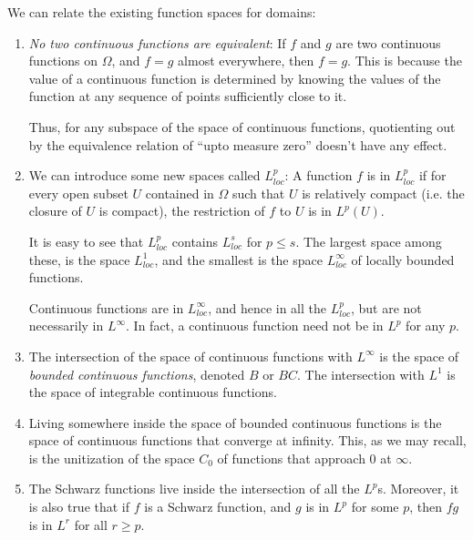 \documentclass[a4paper]{amsart}
\begin{document}
We can relate the existing function spaces for domains:

\begin{enumerate}

\item {\em No two continuous functions are equivalent}: If $f$ and $g$
  are two continuous functions on $\Omega$, and $f = g$ almost
  everywhere, then $f = g$. This is because the value of a continuous
  function is determined by knowing the values of the function at any
  sequence of points sufficiently close to it.

  Thus, for any subspace of the space of continuous functions,
  quotienting out by the equivalence relation of ``upto measure zero''
  doesn't have any effect.

\item We can introduce some new spaces called $L^p_{loc}$: A function
  $f$ is in $L^p_{loc}$ if for every open subset $U$ contained in
  $\Omega$ such that $U$ is relatively compact (i.e. the closure of
  $U$ is compact), the restriction of $f$ to $U$ is in $L^p(U)$.

  It is easy to see that $L^p_{loc}$ contains $L^s_{loc}$ for $p \le
  s$. The largest space among these, is the space $L^1_{loc}$, and the
  smallest is the space $L^\infty_{loc}$ of locally bounded functions.

  Continuous functions are in $L^\infty_{loc}$, and hence in all the
  $L^p_{loc}$, but are not necessarily in $L^\infty$. In fact, a
  continuous function need not be in $L^p$ for any $p$.

\item The intersection of the space of continuous functions with
  $L^\infty$ is the space of {\em bounded continuous functions},
  denoted $B$ or $BC$. The intersection with $L^1$ is the space of
  integrable continuous functions.

\item Living somewhere inside the space of bounded continuous
  functions is the space of continuous functions that converge at
  infinity. This, as we may recall, is the unitization of the space
  $C_0$ of functions that approach $0$ at $\infty$.

\item The Schwarz functions live inside the intersection of all the
  $L^p$s. Moreover, it is also true that if $f$ is a Schwarz function,
  and $g$ is in $L^p$ for some $p$, then $fg$ is in $L^r$ for all $r
  \ge p$.
\end{enumerate}
\end{document}
